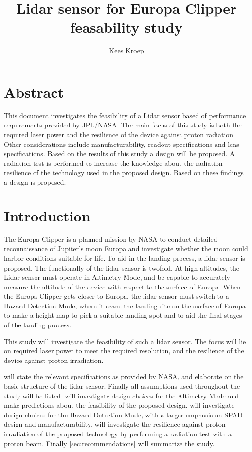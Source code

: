 \documentclass[]{report}
\title{Lidar sensor for Europa Clipper feasability study}
\author{Kees Kroep}
\begin{document}
  \maketitle


\section*{Abstract}
This document investigates the feasibility of a Lidar sensor based of performance requirements provided by JPL/NASA. The main focus of this study is both the required laser power and the resilience of the device against proton radiation. Other considerations include manufacturability, readout specifications and lens specifications. Based on the results of this study a design will be proposed. A radiation test is performed to increase the knowledge about the radiation resilience of the technology used in the proposed design. Based on these findings a design is proposed.

\tableofcontents
\clearpage

\section*{Introduction}
The Europa Clipper is a planned mission by NASA  to conduct  detailed reconnaissance of Jupiter's moon Europa and investigate whether the moon could harbor conditions suitable for life. To aid in the landing process, a lidar sensor is proposed. The functionally of the lidar sensor is twofold. At high altitudes, the Lidar sensor must operate in Altimetry Mode, and be capable to accurately measure the altitude of the device with respect to the surface of Europa. When the Europa Clipper gets closer to Europa, the lidar sensor must switch to a Hazard Detection Mode, where it scans the landing site on the surface of Europa to make a height map to pick a suitable landing spot and to aid the final stages of the landing process.

This study will investigate the feasibility of such a lidar sensor. The focus will lie on required laser power to meet the required resolution, and the resilience of the device against proton irradiation. 

 will state the relevant specifications as provided by NASA, and elaborate on the basic structure of the lidar sensor. Finally all assumptions used throughout the study will be listed.  will investigate design choices for the Altimetry Mode and make predictions about the feasibility of the proposed design.  will investigate design choices for the Hazard Detection Mode, with a larger emphasis on SPAD design and manufacturability.  will investigate the resilience against proton irradiation of the proposed technology by performing a radiation test with a proton beam. Finally \cref{sec:recommendations} will summarize the study.
\end{document}
